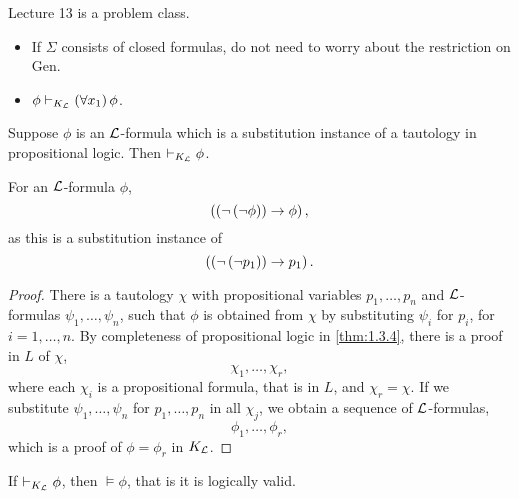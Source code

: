 
Lecture 13 is a problem class.


\begin{remark1}
\hfill
\begin{itemize}
\item If $ \Sigma $ consists of closed formulas, do not need to worry about the restriction on Gen.
\item $ \phi \vdash_{K_{\mathcal{L}}} \left( \forall x_1 \right)\phi $.
\end{itemize}
\end{remark1}

\begin{theorem}
\label{thm:2.4.4}
Suppose $ \phi $ is an $ \mathcal{L} $-formula which is a substitution instance of a tautology in propositional logic. Then $ \vdash_{K_{\mathcal{L}}} \phi $.
\end{theorem}

\begin{example2}
For an $ \mathcal{L} $-formula $ \phi $,
$$ \left( \left( \neg \left( \neg \phi \right) \right) \rightarrow \phi \right), $$
as this is a substitution instance of
$$ \left( \left( \neg \left( \neg p_1 \right) \right) \rightarrow p_1 \right). $$
\end{example2}

\begin{proof}
There is a tautology $ \chi $ with propositional variables $ p_1, \dots, p_n $ and $ \mathcal{L} $-formulas $ \psi_1, \dots, \psi_n $, such that $ \phi $ is obtained from $ \chi $ by substituting $ \psi_i $ for $ p_i $, for $ i = 1, \dots, n $. By completeness of propositional logic in \ref{thm:1.3.4}, there is a proof in $ L $ of $ \chi $,
$$ \chi_1, \dots, \chi_r, $$
where each $ \chi_i $ is a propositional formula, that is in $ L $, and $ \chi_r = \chi $. If we substitute $ \psi_1, \dots, \psi_n $ for $ p_1, \dots, p_n $ in all $ \chi_j $, we obtain a sequence of $ \mathcal{L} $-formulas,
$$ \phi_1, \dots, \phi_r, $$
which is a proof of $ \phi = \phi_r $ in $ K_{\LL} $.
\end{proof}

\begin{theorem}[Soundness of $ K_{\LL} $]
If $ \vdash_{K_{\mathcal{L}}} \phi $, then $ \vDash \phi $, that is it is logically valid.
\end{theorem}

